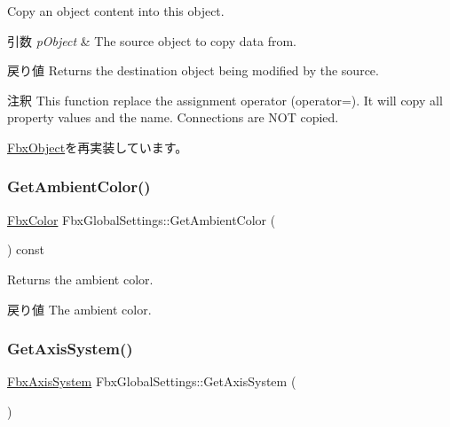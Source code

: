 Copy an object content into this object. 
\begin{DoxyParams}{引数}
{\em p\+Object} & The source object to copy data from. \\
\hline
\end{DoxyParams}
\begin{DoxyReturn}{戻り値}
Returns the destination object being modified by the source. 
\end{DoxyReturn}
\begin{DoxyRemark}{注釈}
This function replace the assignment operator (operator=). It will copy all property values and the name. Connections are N\+OT copied. 
\end{DoxyRemark}


\hyperlink{class_fbx_object_a0c0c5adb38284d14bb82c04d54504a3e}{Fbx\+Object}を再実装しています。

\mbox{\label{class_fbx_global_settings_ab44055e13f94e64cd39d4e35127d3ff0}} 
\subsubsection{\texorpdfstring{Get\+Ambient\+Color()}{GetAmbientColor()}}
{\footnotesize\ttfamily \hyperlink{class_fbx_color}{Fbx\+Color} Fbx\+Global\+Settings\+::\+Get\+Ambient\+Color (\begin{DoxyParamCaption}{ }\end{DoxyParamCaption}) const}

Returns the ambient color. \begin{DoxyReturn}{戻り値}
The ambient color. 
\end{DoxyReturn}
\mbox{\label{class_fbx_global_settings_adf26f4742b088b497a5ecec8f458e47d}} 
\subsubsection{\texorpdfstring{Get\+Axis\+System()}{GetAxisSystem()}}
{\footnotesize\ttfamily \hyperlink{class_fbx_axis_system}{Fbx\+Axis\+System} Fbx\+Global\+Settings\+::\+Get\+Axis\+System (\begin{DoxyParamCaption}{ }\end{DoxyParamCaption})}

